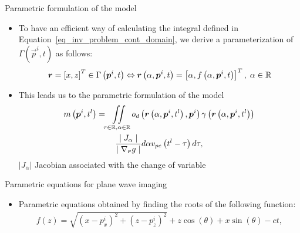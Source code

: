 {\begin{block}{Parametric formulation of the model}
\begin{itemize}
\begin{align}
	\end{align}
	$g\left(\vec{r}, \vec{p}^i, t\right) = t - t_{Tx} \left(\vec{r}\right) - t_{Rx} \left(\vec{r}, \vec{p}^i\right)$, $\Gamma \left(\vec{p}^i, t \right) = \left\lbrace \vec{r} \in \Omega \; | \; g\left(\vec{r}, \vec{p}^i, t \right) = 0 \right\rbrace$, $\nabla_{\vec{r}} g$ denotes the gradient of $g$ w.r.t $\vec{r}$, $d\sigma \left(\vec{r}\right)$ is the measure over the 1D-curve $\Gamma \left(\vec{p}^i, t \right)$
	\item To have an efficient way of calculating the integral defined in Equation~\eqref{eq_inv_problem_cont_domain}, we derive a parameterization of $\Gamma \left(\vec{p}^i, t \right)$ as follows:
	\begin{equation}
	\label{eq_param_equation_generic}
	\bm{r} = \left[x, z\right]^T \in \Gamma \left(\bm{p}^i, t \right) \Leftrightarrow \bm{r}\left(\alpha, \bm{p}^i, t\right)= \left[\alpha, f\left(\alpha, \bm{p}^i, t \right)\right]^T, \; \alpha \in \mathbb{R}
	\end{equation}
	\item This leads us to the parametric formulation of the model
	\begin{multline}
	\label{eq_inv_problem_cont_domain_parameterized}
	m\left(\bm{p}^i, t^l\right) = \iint \limits_{\tau \in \mathbb{R}, \alpha \in \mathbb{R}} o_d\left(\bm{r}\left(\alpha, \bm{p}^i, t^l\right), \bm{p}^i\right)\gamma \left(\bm{r}\left(\alpha, \bm{p}^i, t^l\right)\right) \\ \frac{\mid J_\alpha \mid}{\mid \nabla_{\bm{r}} g \mid} d\alpha v_{pe} \left(t^l - \tau\right) d \tau, 
	\end{multline}
	$|J_\alpha|$ Jacobian associated with the change of variable
\end{itemize}	
\end{block}
\vfill
\begin{block}{Parametric equations for plane wave imaging}
	\begin{itemize}
		\item Parametric equations obtained by finding the roots of the following function:
		\begin{align}
		f \left(z\right) = \sqrt{\left(x-p^i_x\right)^2 + \left(z-p^i_z\right)^2} + z \cos\left(\theta\right)  + x \sin\left(\theta\right) - ct,
		\end{align}

\end{itemize}
\end{block}}
